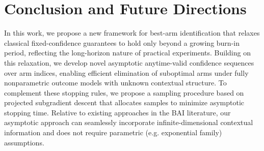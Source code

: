 \documentclass{article}
\begin{document}



\section{Conclusion and Future Directions}\label{sec:conclusion}

In this work, we propose a new framework for best-arm identification that relaxes classical fixed-confidence guarantees to hold only beyond a growing burn-in period, reflecting the long-horizon nature of practical experiments. Building on this relaxation, we develop novel asymptotic anytime-valid confidence sequences over arm indices, enabling efficient elimination of suboptimal arms under fully nonparametric outcome models with unknown contextual structure. To complement these stopping rules, we propose a sampling procedure based on projected subgradient descent that allocates samples to minimize asymptotic stopping time. Relative to existing approaches in the BAI literature, our asymptotic approach can seamlessly incorporate infinite-dimensional contextual information and does not require parametric (e.g. exponential family) assumptions. 
\end{document}
